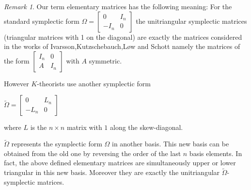 \documentclass[10pt]{amsart}
\theoremstyle{remark}
\newtheorem{rema}[theo]{Remark}
\begin{document}
\begin{rema}\label{symplectic form} 
Our term elementary matrices has the following meaning: 
For the standard symplectic form $\Omega =  \left[\begin{array}{ccc} 0 & I_n \\ -I_n & 0\end{array}\right]$ the unitriangular
symplectic matrices (triangular matrices with 1 on the diagonal) are exactly
the matrices considered in the works of Ivarsson,Kutzschebauch,L\o w and Schott namely the matrices of the form
$\left[\begin{array}{ccc} I_n & 0 \\ A & I_n\end{array}\right]$
with $A$ symmetric. 

However $K$-theorists use another symplectic form \begin{center}
    $\tilde{\Omega} =  \left[\begin{array}{ccc} 0 & L_n \\ -L_n & 0\end{array}\right]$
\end{center}
where $L$ is the $n \times n$ matrix with $1$ along the skew-diagonal.

$\tilde{\Omega}$ represents the symplectic form $\Omega$ in another basis.
This new basis can be obtained from the old one by reversing the order of the last $n$ basis elements.  In fact, the above defined elementary matrices are simultaneously upper or lower triangular in this new basis. Moreover they are exactly the unitriangular
 $\tilde{\Omega}$-symplectic matrices. 


\end{rema}
\end{document}
